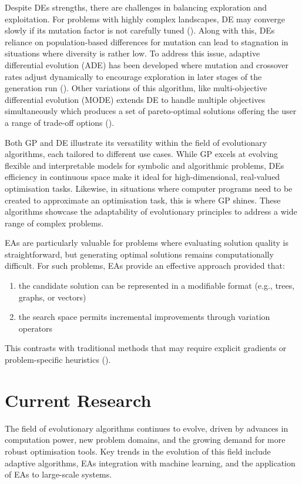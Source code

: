 \parbreak\noindent Despite DEs strengths, there are challenges in balancing exploration and exploitation. For problems with highly complex landscapes, DE may converge slowly if its mutation factor is not carefully tuned (\cite{das2010differential}). Along with this, DEs reliance on population-based differences for mutation can lead to stagnation in situations where diversity is rather low. To address this issue, adaptive differential evolution (ADE) has been developed where mutation and crossover rates adjust dynamically to encourage exploration in later stages of the generation run (\cite{das2010differential}). Other variations of this algorithm, like multi-objective differential evolution (MODE) extends DE to handle multiple objectives simultaneously which produces a set of pareto-optimal solutions offering the user a range of trade-off options (\cite{xue2003pareto}).

\parbreak\noindent Both GP and DE illustrate its versatility within the field of evolutionary algorithms, each tailored to different use cases. While GP excels at evolving flexible and interpretable models for symbolic and algorithmic problems, DEs efficiency in continuous space make it ideal for high-dimensional, real-valued optimisation tasks. Likewise, in situations where computer programs need to be created to approximate an optimisation task, this is where GP shines. These algorithms showcase the adaptability of evolutionary principles to address a wide range of complex problems.

\parbreak\noindent EAs are particularly valuable for problems where evaluating solution quality is straightforward, but generating optimal solutions remains computationally difficult. For such problems, EAs provide an effective approach provided that:
\begin{enumerate}
	\item the candidate solution can be represented in a modifiable format (e.g., trees, graphs, or vectors)
	\item the search space permits incremental improvements through variation operators
\end{enumerate}

\noindent This contrasts with traditional methods that may require explicit gradients or problem-specific heuristics (\cite{intelligentOptimization}).


\section{Current Research}\label{sec:ea_current_research}
The field of evolutionary algorithms continues to evolve, driven by advances in computation power, new problem domains, and the growing demand for more robust optimisation tools. Key trends in the evolution of this field include adaptive algorithms, EAs integration with machine learning, and the application of EAs to large-scale systems.

